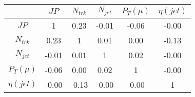 \begin{tabular}{|c|c|c|c|c|c|} 
\hline
 & $JP$ & $N_{trk}$ & $N_{jet}$ & $P_{T} (\mu)$ & $\eta (jet)$ \\ \hline
$JP$ & 1 & 0.23 & -0.01 & -0.06 & -0.00 \\
$N_{trk}$ & 0.23 & 1 & 0.01 & 0.00 & -0.13 \\
$N_{jet}$ & -0.01 & 0.01 & 1 & 0.02 & -0.00 \\
$P_{T} (\mu)$ & -0.06 & 0.00 & 0.02 & 1 & -0.00 \\
$\eta (jet)$ & -0.00 & -0.13 & -0.00 & -0.00 & 1 \\
\hline 
\end{tabular} 


